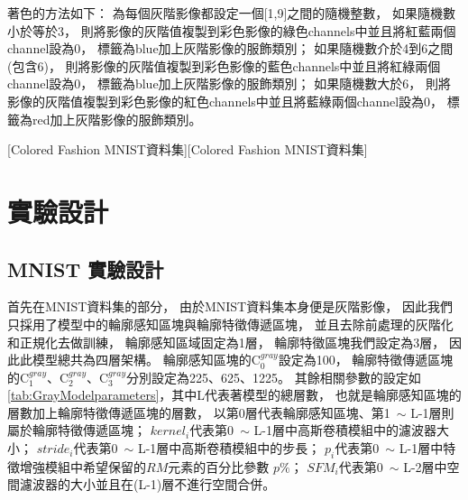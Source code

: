 \documentclass[class=NCU\_thesis, crop=false]{standalone}
\begin{document}
    著色的方法如下：
    為每個灰階影像都設定一個[1,9]之間的隨機整數，
    如果隨機數小於等於3，
    則將影像的灰階值複製到彩色影像的綠色channels中並且將紅藍兩個channel設為0，
    標籤為blue加上灰階影像的服飾類別；
    如果隨機數介於4到6之間(包含6)，
    則將影像的灰階值複製到彩色影像的藍色channels中並且將紅綠兩個channel設為0，
    標籤為blue加上灰階影像的服飾類別；
    如果隨機數大於6，
    則將影像的灰階值複製到彩色影像的紅色channels中並且將藍綠兩個channel設為0，
    標籤為red加上灰階影像的服飾類別。

    [Colored Fashion MNIST資料集][Colored Fashion MNIST資料集]
    \pagebreak
\section{實驗設計}
    \subsection{MNIST 實驗設計}
    首先在MNIST資料集的部分，
    由於MNIST資料集本身便是灰階影像，
    因此我們只採用了模型中的輪廓感知區塊與輪廓特徵傳遞區塊，
    並且去除前處理的灰階化和正規化去做訓練，
    輪廓感知區域固定為1層，
    輪廓特徵區塊我們設定為3層，
    因此此模型總共為四層架構。
    輪廓感知區塊的C$^{gray}_{0}$設定為100，
    輪廓特徵傳遞區塊的C$^{gray}_{1}$、C$^{gray}_{2}$、C$^{gray}_{3}$分別設定為225、625、1225。
    其餘相關參數的設定如\cref{tab:GrayModelparameters}，其中L代表著模型的總層數，
    也就是輪廓感知區塊的層數加上輪廓特徵傳遞區塊的層數，
    以第0層代表輪廓感知區塊、第1~$\sim$ L-1層則屬於輪廓特徵傳遞區塊；
    $kernel_{i}$代表第0~$\sim$ L-1層中高斯卷積模組中的濾波器大小；
    $stride_{i}$代表第0~$\sim$ L-1層中高斯卷積模組中的步長；
    $p_{i}$代表第0~$\sim$ L-1層中特徵增強模組中希望保留的$RM$元素的百分比參數 $p\%$；
    $SFM_{i}$代表第0~$\sim$ L-2層中空間濾波器的大小並且在(L-1)層不進行空間合併。
\end{document}
